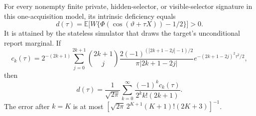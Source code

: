 \begin{theorem}
\label{thm:v16-exactphysical}
For every nonempty finite private, hidden-selector, or visible-selector
signature in this one-acquisition model, its intrinsic deficiency equals
\begin{equation}\label{eq:v16-delta}
 d(\tau)=\mathbb E\bigl[W\{\Phi(\cos(\vartheta+\tau X))-1/2\}\bigr]>0.
\end{equation}
It is attained by the stateless simulator that draws the target's
unconditional report marginal. If
\[
 c_k(\tau)=2^{-(2k+1)}\sum_{j=0}^{2k+1}\binom{2k+1}{j}
 \frac{2(-1)^{(|2k+1-2j|-1)/2}}{\pi|2k+1-2j|}
 e^{-(2k+1-2j)^2\tau^2/2},
\]
then
\begin{equation}\label{eq:v16-series}
 d(\tau)=\frac1{\sqrt{2\pi}}
      \sum_{k=0}^\infty\frac{(-1)^kc_k(\tau)}{2^kk!(2k+1)}.
\end{equation}
The error after $k=K$ is at most
$[\sqrt{2\pi}\,2^{K+1}(K+1)!(2K+3)]^{-1}$.
\end{theorem}
